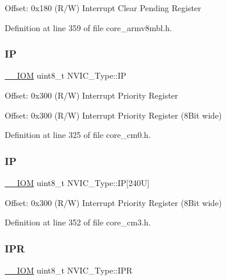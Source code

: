 Offset\+: 0x180 (R/W) Interrupt Clear Pending Register 

Definition at line 359 of file core\+\_\+armv8mbl.\+h.

\mbox{\label{struct_n_v_i_c___type_a4eef47929a0d1317a107f1ac62e28464}} 
\subsubsection{\texorpdfstring{IP}{IP}\hspace{0.1cm}{\footnotesize\ttfamily [1/2]}}
{\footnotesize\ttfamily \hyperlink{core__sc300_8h_ab6caba5853a60a17e8e04499b52bf691}{\+\_\+\+\_\+\+I\+OM} uint8\+\_\+t N\+V\+I\+C\+\_\+\+Type\+::\+IP}

Offset\+: 0x300 (R/W) Interrupt Priority Register

Offset\+: 0x300 (R/W) Interrupt Priority Register (8\+Bit wide) 

Definition at line 325 of file core\+\_\+cm0.\+h.

\mbox{\label{struct_n_v_i_c___type_a9a4341692e45d089a113986a3d344e98}} 
\subsubsection{\texorpdfstring{IP}{IP}\hspace{0.1cm}{\footnotesize\ttfamily [2/2]}}
{\footnotesize\ttfamily \hyperlink{core__sc300_8h_ab6caba5853a60a17e8e04499b52bf691}{\+\_\+\+\_\+\+I\+OM} uint8\+\_\+t N\+V\+I\+C\+\_\+\+Type\+::\+IP\mbox{[}240\+U\mbox{]}}

Offset\+: 0x300 (R/W) Interrupt Priority Register (8\+Bit wide) 

Definition at line 352 of file core\+\_\+cm3.\+h.

\mbox{\label{struct_n_v_i_c___type_a71598b2d46c2fa6708a7908a1c63c43c}} 
\subsubsection{\texorpdfstring{I\+PR}{IPR}\hspace{0.1cm}{\footnotesize\ttfamily [1/2]}}
{\footnotesize\ttfamily \hyperlink{core__sc300_8h_ab6caba5853a60a17e8e04499b52bf691}{\+\_\+\+\_\+\+I\+OM} uint8\+\_\+t N\+V\+I\+C\+\_\+\+Type\+::\+I\+PR}


